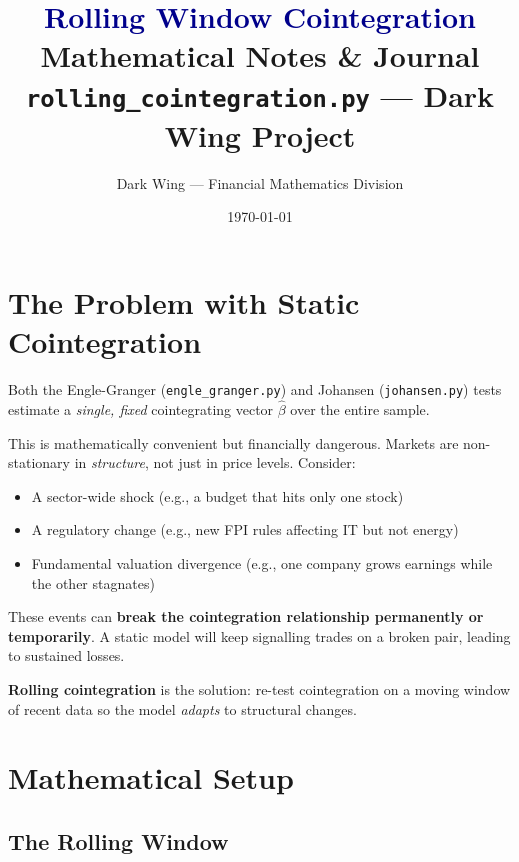 \documentclass[12pt, a4paper]{article}
\title{
    \Huge\textbf{\textcolor{darkblue}{Rolling Window Cointegration}} \\[0.5em]
    \Large Mathematical Notes \& Journal \\[0.5em]
    \large \texttt{rolling\_cointegration.py} — Dark Wing Project
}
\author{Dark Wing — Financial Mathematics Division}
\date{\today}
\begin{document}
\maketitle
\tableofcontents
\newpage

\section{The Problem with Static Cointegration}

Both the Engle-Granger (\texttt{engle\_granger.py}) and Johansen (\texttt{johansen.py}) tests 
estimate a \emph{single, fixed} cointegrating vector $\hat\beta$ over the entire sample.

This is mathematically convenient but financially dangerous. Markets are non-stationary in 
\emph{structure}, not just in price levels. Consider:

\begin{itemize}
    \item A sector-wide shock (e.g., a budget that hits only one stock)
    \item A regulatory change (e.g., new FPI rules affecting IT but not energy)
    \item Fundamental valuation divergence (e.g., one company grows earnings while the other stagnates)
\end{itemize}

These events can \textbf{break the cointegration relationship permanently or temporarily}. 
A static model will keep signalling trades on a broken pair, leading to sustained losses.

\medskip
\textbf{Rolling cointegration} is the solution: re-test cointegration on a moving window 
of recent data so the model \emph{adapts} to structural changes.

\section{Mathematical Setup}

\subsection{The Rolling Window}
\end{document}

